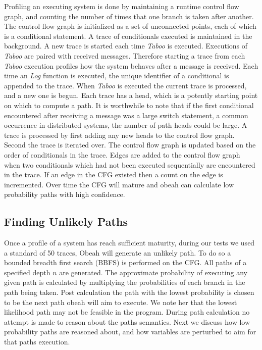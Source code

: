 Profiling an executing system is done by maintaining a runtime control flow
graph, and counting the number of times that one branch is taken after another.
The control flow graph is initialized as a set of unconnected points, each of
which is a conditional statement. A trace of conditionals executed is
maintained in the background. A new trace is started each time \emph{Taboo} is
executed. Executions of \emph{Taboo} are paired with received messages.
Therefore starting a trace from each \emph{Taboo} execution profiles how the
system behaves after a message is received. Each time an \emph{Log} function is
executed, the unique identifier of a conditional is appended to the trace. When
\emph{Taboo} is executed the current trace is processed, and a new one is
begun. Each trace has a head, which is a potently starting point on which to
compute a path. It is worthwhile to note that if the first conditional
encountered after receiving a message was a large switch statement, a common
occurrence in distributed systems, the number of path heads could be large. A
trace is processed by first adding any new heads to the control flow graph.
Second the trace is iterated over. The control flow graph is updated based on
the order of conditionals in the trace. Edges are added to the control flow
graph when two conditionals which had not been executed sequentially are
encountered in the trace. If an edge in the CFG existed then a count on the
edge is incremented. Over time the CFG will mature and obeah can calculate low
probability paths with high confidence.

\subsection{Finding Unlikely Paths}

Once a profile of a system has reach sufficient maturity, during our tests we
used a standard of 50 traces, Obeah will generate an unlikely path. To do so a
bounded breadth first search (BBFS) is performed on the CFG. All paths of a
specified depth $n$ are generated. The approximate probability of executing any
given path is calculated by multiplying the probabilities of each branch in the
path being taken. Post calculation the path with the lowest probability is
chosen to be the next path obeah will aim to execute. We note her that the
lowest likelihood path may not be feasible in the program. During path
calculation no attempt is made to reason about the paths semantics. Next we
discuss how low probability paths are reasoned about, and how variables are
perturbed to aim for that paths execution.

